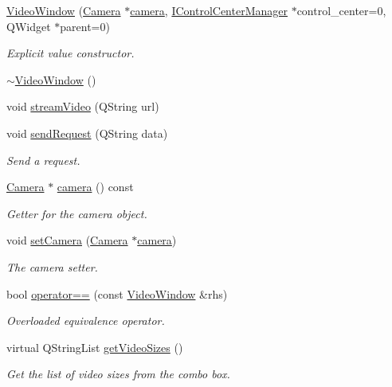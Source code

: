 \begin{DoxyCompactItemize}
\item 
\hyperlink{classVideoWindow_a1230a803d626de946e9fa67ebcafe1c2}{Video\-Window} (\hyperlink{classCamera}{Camera} $\ast$\hyperlink{classVideoWindow_aa163a5850ff726c12f59562b993e4403}{camera}, \hyperlink{classIControlCenterManager}{I\-Control\-Center\-Manager} $\ast$control\-\_\-center=0, Q\-Widget $\ast$parent=0)
\begin{DoxyCompactList}\small\item\em Explicit value constructor. \end{DoxyCompactList}\item 
\hyperlink{classVideoWindow_a3c5b83ed86071f9210388f0e06ac4876}{$\sim$\-Video\-Window} ()
\item 
void \hyperlink{classVideoWindow_ac71a3e790d6956a26369294d5fb36c93}{stream\-Video} (Q\-String url)
\item 
void \hyperlink{classVideoWindow_af5830c7faa6e46a69be02c93abc28d3a}{send\-Request} (Q\-String data)
\begin{DoxyCompactList}\small\item\em Send a request. \end{DoxyCompactList}\item 
\hyperlink{classCamera}{Camera} $\ast$ \hyperlink{classVideoWindow_aa163a5850ff726c12f59562b993e4403}{camera} () const 
\begin{DoxyCompactList}\small\item\em Getter for the camera object. \end{DoxyCompactList}\item 
void \hyperlink{classVideoWindow_a612b1b179b04ccebce717ff2fd95879e}{set\-Camera} (\hyperlink{classCamera}{Camera} $\ast$\hyperlink{classVideoWindow_aa163a5850ff726c12f59562b993e4403}{camera})
\begin{DoxyCompactList}\small\item\em The camera setter. \end{DoxyCompactList}\item 
bool \hyperlink{classVideoWindow_af11854a41b4e79c396c04bc40789b46d}{operator==} (const \hyperlink{classVideoWindow}{Video\-Window} \&rhs)
\begin{DoxyCompactList}\small\item\em Overloaded equivalence operator. \end{DoxyCompactList}\item 
virtual Q\-String\-List \hyperlink{classVideoWindow_a194af961938fb7a0482932dc6787ec6f}{get\-Video\-Sizes} ()
\begin{DoxyCompactList}\small\item\em Get the list of video sizes from the combo box. \end{DoxyCompactList}\end{DoxyCompactItemize}
